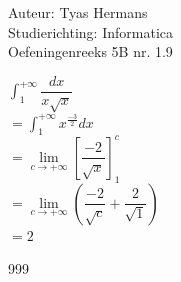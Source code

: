 \documentclass[a4paper]{article}
\newcommand{\dint}{\displaystyle\int}
\begin{document}
  
\noindent \large Auteur: Tyas Hermans \\
\noindent \large Studierichting: Informatica\\
\noindent \large Oefeningenreeks 5B nr. 1.9\\

\medskip

\normalsize

$\dint_1^{+\infty}\dfrac{dx}{x\sqrt{x}}$\\

$=\dint_1^{+\infty} x^{\tfrac{-3}{2}}dx$\\

$= \lim\limits_{c\rightarrow +\infty} \left[\dfrac{-2}{\sqrt{x}}\right]_1^c$\\

$= \lim\limits_{c\rightarrow +\infty} \left(\dfrac{-2}{\sqrt{c}} + \dfrac{2}{\sqrt{1}}\right)$\\

$= 2$\\

\begin{thebibliography}{999}
\end{thebibliography}
\end{document}
